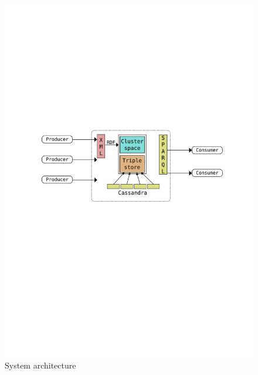 \documentclass[conference]{IEEEtran}
\begin{document}
\begin{figure}
    \centering
    \includegraphics[scale=0.5]{images/architecture}
    \caption{System architecture}
    \label{fig:architecture}
\end{figure}
\end{document}
